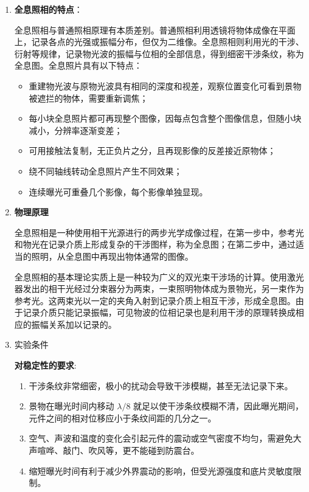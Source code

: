 \documentclass[dvipsnames, svgnames,a4paper,11pt]{article}
\begin{document}
	\begin{enumerate}
		\item \textbf{全息照相的特点}：
		
			全息照相与普通照相原理有本质差别。普通照相利用透镜将物体成像在平面上，记录各点的光强或振幅分布，但仅为二维像。全息照相则利用光的干涉、衍射等规律，记录物光波的振幅与位相的全部信息，得到细密干涉条纹，称为全息图。全息照片具有以下特点：
			\begin{itemize}
				\item 重建物光波与原物光波具有相同的深度和视差，观察位置变化可看到景物被遮拦的物体，需要重新调焦；
				
				\item 每小块全息照片都可再现整个图像，因每点包含整个图像信息，但随小块减小，分辨率逐渐变差；
				
				\item 可用接触法复制，无正负片之分，且再现影像的反差接近原物体；
				
				\item 绕不同轴线转动全息照片产生不同效果；
				
				\item 连续曝光可重叠几个影像，每个影像单独显现。
			\end{itemize}
		\item \textbf{物理原理}
			
			全息照相是一种使用相干光源进行的两步光学成像过程，在第一步中，参考光和物光在记录介质上形成复杂的干涉图样，称为全息图；在第二步中，通过适当的照明，从全息图中再现出物体通常的图像。
			
			全息照相的基本理论实质上是一种较为广义的双光束干涉场的计算。使用激光器发出的相干光经过分束器分为两束，一束照明物体成为景物光，另一束作为参考光。这两束光以一定的夹角入射到记录介质上相互干涉，形成全息图。由于记录介质只能记录振幅，可见物波的位相记录也是利用干涉的原理转换成相应的振幅关系加以记录的。
			
			
			
			
			
		\item 实验条件
			
			\textbf{对稳定性的要求}:
				\begin{enumerate}[label=\roman*.]
					\item 干涉条纹非常细密，极小的扰动会导致干涉模糊，甚至无法记录下来。
					\item 景物在曝光时间内移动 $\lambda/8$ 就足以使干涉条纹模糊不清，因此曝光期间，元件之间的相对位移应小于条纹间距的几分之一。
					\item 空气、声波和温度的变化会引起元件的震动或空气密度不均匀，需避免大声喧哗、敲门、吹风等，更不能碰到防震台。
					\item 缩短曝光时间有利于减少外界震动的影响，但受光源强度和底片灵敏度限制。
				\end{enumerate}
	 

\end{enumerate}
\end{document}
